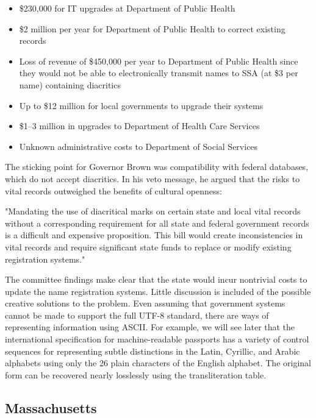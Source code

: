 \begin{itemize}

\item \$230,000 for IT upgrades at Department of Public Health
\item \$2 million per year for Department of Public Health to correct existing
records
\item Loss of revenue of \$450,000 per year to Department of Public Health since
they would not be able to electronically transmit names to SSA (at \$3 per name)
containing diacritics
\item Up to \$12 million for local governments to upgrade their systems
\item \$1--3 million in upgrades to Department of Health Care Services
\item Unknown administrative costs to Department of Social Services

\end{itemize}

The sticking point for Governor Brown was compatibility with federal databases,
which do not accept diacritics. In his veto message, he argued that the risks to
vital records outweighed the benefits of cultural openness:

"Mandating the use of diacritical marks on certain state and local vital records
without a corresponding requirement for all state and federal government records
is a difficult and expensive proposition. This bill would create inconsistencies
in vital records and require significant state funds to replace or modify
existing registration systems."

The committee findings make clear that the state would incur nontrivial costs to
update the name registration systems. Little discussion is included of the
possible creative solutions to the problem. Even assuming that government
systems cannot be made to support the full UTF-8 standard, there are ways of
representing information using ASCII. For example, we will see later that the
international specification for machine-readable passports has a variety of
control sequences for representing subtle distinctions in the Latin, Cyrillic,
and Arabic alphabets using only the 26 plain characters of the English alphabet.
The original form can be recovered nearly losslessly using the transliteration
table.

\subsection{Massachusetts}

